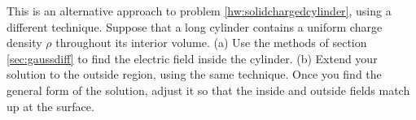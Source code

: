 This is an alternative approach to problem \ref{hw:solidchargedcylinder},
        using a different technique.
        Suppose that a long cylinder contains a uniform charge
        density $\rho$ throughout its interior volume. \hwendpart
        (a) Use the methods of section \ref{sec:gaussdiff}
        to find the electric field inside the cylinder. \answercheck\hwendpart
        (b) Extend your solution to the outside region, using the same
        technique. Once you find the general form of the solution,
        adjust it so that the inside and outside fields match up at
        the surface.\answercheck
